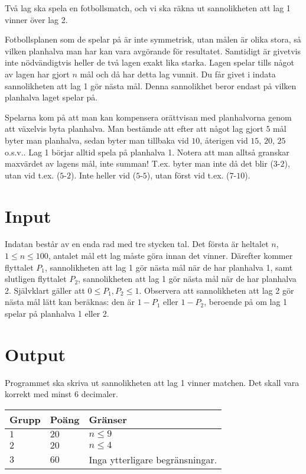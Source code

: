
Två lag ska spela en fotbollsmatch, och vi ska räkna ut sannolikheten att lag 1 vinner över lag 2.

Fotbollsplanen som de spelar på är inte symmetrisk, utan målen är olika stora, så vilken planhalva man har kan vara avgörande för resultatet. Samtidigt är givetvis inte nödvändigtvis heller de två lagen exakt lika starka. Lagen spelar tills något av lagen har gjort $n$ mål och då har detta lag vunnit. Du får givet i indata sannolikheten att lag 1 gör nästa mål. Denna sannolikhet beror endast på vilken planhalva laget spelar på.

Spelarna kom på att man kan kompensera orättvisan med planhalvorna genom att växelvis byta planhalva. Man bestämde att efter att något lag gjort $5$ mål byter man planhalva, sedan byter man tillbaka vid $10$, återigen vid $15$, $20$, $25$ o.s.v.. Lag 1 börjar alltid spela på planhalva 1. Notera att man alltså granskar maxvärdet av lagens mål, inte summan! T.ex. byter man inte då det blir ($3$-$2$), utan vid t.ex. ($5$-$2$). Inte heller vid ($5$-$5$), utan först vid t.ex. ($7$-$10$).

\section*{Input}
Indatan består av en enda rad med tre stycken tal. Det första är heltalet $n$, $1 \leq n \leq 100$, antalet mål ett lag måste göra innan det vinner. Därefter kommer flyttalet $P_1$, sannolikheten att lag 1 gör nästa mål när de har planhalva 1, samt slutligen flyttalet $P_2$, sannolikheten att lag 1 gör nästa mål när de har planhalva 2. Självklart gäller att $0 \leq P_1, P_2 \leq 1$. Observera att sannolikheten att lag 2 gör nästa mål lätt kan beräknas: den är $1 - P_1$ eller $1 - P_2$, beroende på om lag 1 spelar på planhalva 1 eller 2.

\section*{Output}
Programmet ska skriva ut sannolikheten att lag 1 vinner matchen. Det skall vara korrekt med minst $6$ decimaler.

\noindent
\begin{tabular}{| l | l | p{12cm} |}
  \hline
  \textbf{Grupp} & \textbf{Poäng} & \textbf{Gränser} \\ \hline
  $1$    & $20$          & $n \leq 9$  \\ \hline
  $2$    & $20$          & $n \leq 4$  \\ \hline
  $3$    & $60$          & Inga ytterligare begränsningar.  \\ \hline
\end{tabular}
